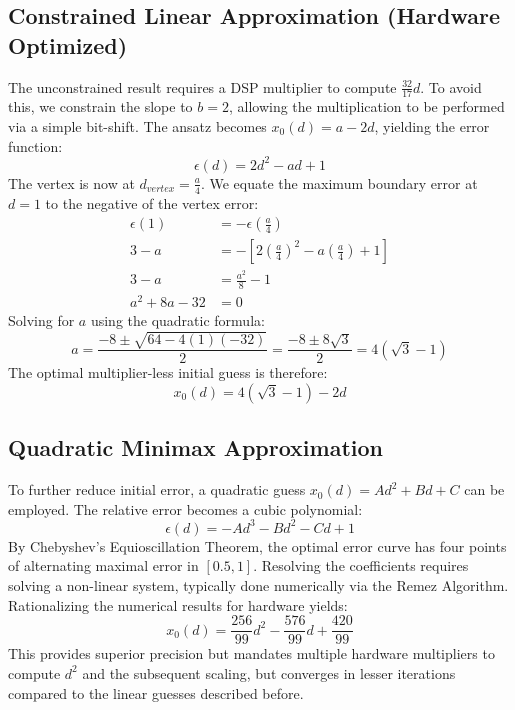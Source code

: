\documentclass{article}
\begin{document}
\subsection{Constrained Linear Approximation (Hardware Optimized)}
The unconstrained result requires a DSP multiplier to compute $\frac{32}{17}d$. To avoid this, we constrain the slope to $b=2$, allowing the multiplication to be performed via a simple bit-shift. The ansatz becomes $x_0(d) = a - 2d$, yielding the error function:
\begin{equation}
    \epsilon(d) = 2d^2 - ad + 1
\end{equation}
The vertex is now at $d_{vertex} = \frac{a}{4}$. We equate the maximum boundary error at $d=1$ to the negative of the vertex error:
\begin{align*}
    \epsilon(1) &= -\epsilon\left(\frac{a}{4}\right) \\
    3 - a &= -\left[ 2\left(\frac{a}{4}\right)^2 - a\left(\frac{a}{4}\right) + 1 \right] \\
    3 - a &= \frac{a^2}{8} - 1 \\
    a^2 + 8a - 32 &= 0
\end{align*}
Solving for $a$ using the quadratic formula:
\begin{equation}
    a = \frac{-8 \pm \sqrt{64 - 4(1)(-32)}}{2} = \frac{-8 \pm 8\sqrt{3}}{2} = 4(\sqrt{3} - 1)
\end{equation}
The optimal multiplier-less initial guess is therefore:
\begin{equation}
    x_0(d) = 4(\sqrt{3} - 1) - 2d
\end{equation}

\subsection{Quadratic Minimax Approximation}
To further reduce initial error, a quadratic guess $x_0(d) = Ad^2 + Bd + C$ can be employed. The relative error becomes a cubic polynomial:
\begin{equation}
    \epsilon(d) = -Ad^3 - Bd^2 - Cd + 1
\end{equation}
By Chebyshev's Equioscillation Theorem, the optimal error curve has four points of alternating maximal error in $[0.5, 1]$. Resolving the coefficients requires solving a non-linear system, typically done numerically via the Remez Algorithm. Rationalizing the numerical results for hardware yields:
\begin{equation}
    x_0(d) = \frac{256}{99}d^2 - \frac{576}{99}d + \frac{420}{99}
\end{equation}
This provides superior precision but mandates multiple hardware multipliers to compute $d^2$ and the subsequent scaling, but converges in lesser iterations compared to the linear guesses described before.
\end{document}

